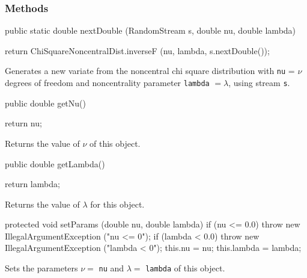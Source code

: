 \subsubsection* {Methods}
\begin{code}

   public static double nextDouble (RandomStream s,
                                    double nu, double lambda) \begin{hide} {
      return ChiSquareNoncentralDist.inverseF (nu, lambda, s.nextDouble());
   }
\end{hide}
\end{code}
\begin{tabb} Generates a new variate from the noncentral chi square
distribution with \texttt{nu} = $\nu$ degrees of freedom and noncentrality
parameter \texttt{lambda} $=\lambda$,
 using stream \texttt{s}.
\end{tabb}
\begin{code}

   public double getNu()\begin{hide} {
      return nu;
   }\end{hide}
\end{code}
 \begin{tabb} Returns the value of  $\nu$ of this object.
 \end{tabb}
\begin{code}

   public double getLambda()\begin{hide} {
      return lambda;
   }\end{hide}
\end{code}
\begin{tabb}
  Returns the value of $\lambda$ for this object.
\end{tabb}
\begin{hide}\begin{code}

   protected void setParams (double nu, double lambda) {
      if (nu <= 0.0)
         throw new IllegalArgumentException ("nu <= 0");
      if (lambda < 0.0)
         throw new IllegalArgumentException ("lambda < 0");
      this.nu = nu;
      this.lambda = lambda;
   }
\end{code}
\begin{tabb} Sets the parameters $\nu =$ \texttt{nu} and $\lambda = $
  \texttt{lambda} of this object.
\end{tabb}
\begin{code}
}
\end{code}
\end{hide}
